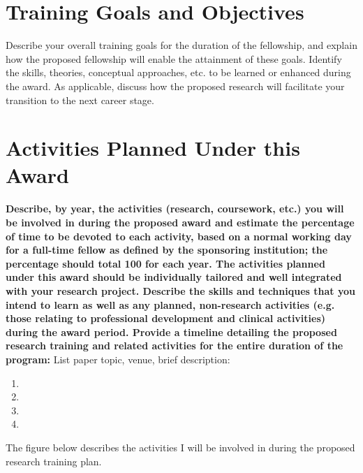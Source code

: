 \documentclass[11pt]{article}
\begin{document}
\lipsum[6-8]

\section*{Training Goals and Objectives}
Describe your overall training goals for the duration of the fellowship, and explain how the proposed fellowship will enable the attainment of these goals. Identify the skills, theories, conceptual approaches, etc. to be learned or enhanced during the award. As applicable, discuss how the proposed research will facilitate your transition to the next career stage.

\lipsum[9-10]

\section*{Activities Planned Under this Award}
\textbf{Describe, by year, the activities (research, coursework, etc.) you will be involved in during the proposed award and estimate the percentage of time to be devoted to each activity, based on a normal working day for a full-time fellow as defined by the sponsoring institution; the percentage should total 100 for each year. The activities planned under this award should be individually tailored and well integrated with your research project. Describe the skills and techniques that you intend to learn as well as any planned, non-research activities (e.g. those relating to professional development and clinical activities) during the award period. Provide a timeline detailing the proposed research training and related activities for the entire duration of the program:
}
List paper topic, venue, brief description:

\begin{enumerate}
\item \lipsum[11]
\item \lipsum[12]
\item \lipsum[13]
\item \lipsum[14]
\end{enumerate}

The figure below describes the activities I will be involved in during the proposed research training plan.
\end{document}
